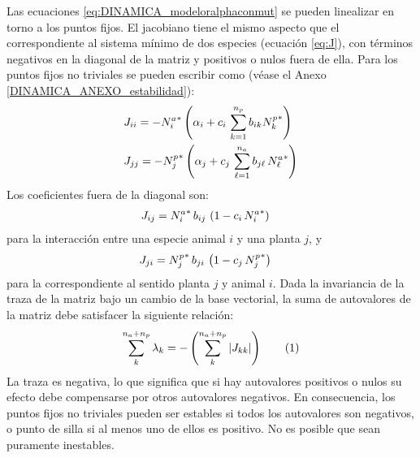Las ecuaciones  \ref{eq:DINAMICA_modeloralphaconmut} se pueden linealizar en torno a los puntos fijos. El jacobiano tiene el mismo aspecto que el correspondiente al sistema mínimo de dos especies (ecuación \eqref{eq:J}), con términos negativos en la diagonal de la matriz y positivos o nulos fuera de ella. Para los puntos fijos no triviales se pueden escribir como (véase el Anexo \ref{DINAMICA_ANEXO_estabilidad}):
\begin{align}
\displaystyle & J_{ii}= - {N^{a}_{i}}^* \left(\alpha_{i} + c_{i} \,  \sum_{k=1}^{n_{p}} b_{ik} {N^{p}_{k}}^* \right) \nonumber\\
\displaystyle & J_{jj}= - {N^{p}_{j}}^* \left(\alpha_{j} + c_{j} \, \sum_{\ell=1}^{n_{a}} b_{j\ell}\, {N^{a}_{\ell}}^*\right)
\label{eq:Jii}
\end{align}
Los coeficientes fuera de la diagonal son:
\begin{align}
\displaystyle & J_{ij}={N^{a}_{i}}^* \, b_{ij}\, \left( 1-c_{i}\, {N^{a}_{i}}^*\right) 
\label{eq:Jij1}
\end{align}
para la interacción entre una especie animal $i$ y una planta $j$, y 
\begin{align}
\displaystyle & J_{ji}={N^{p}_{j}}^* \, b_{ji}\, \left( 1-c_{j}\, {N^{p}_{j}}^*\right)
\label{eq:Jij2}
\end{align}
para la correspondiente al sentido planta $j$ y animal $i$. Dada la invariancia de la traza de la matriz bajo un cambio de la base vectorial, la suma de autovalores de la matriz debe satisfacer la siguiente relación:
\begin{equation}
  \sum_{k}^{n_{a}+n_{p}} \lambda_{k}= - \left(\sum_{k}^{n_{a}+n_{p}} |J_{kk}| \right)
  \stepcounter{equation}\tag{\theequation}\label{eq:sum_lambdas2}
\end{equation}
La traza es negativa, lo que significa que si hay autovalores positivos o nulos su efecto debe compensarse por otros autovalores negativos. En consecuencia, los puntos fijos no triviales pueden ser estables si todos los autovalores son negativos, o punto de silla si al menos uno de ellos es positivo. No es posible que sean puramente inestables.

